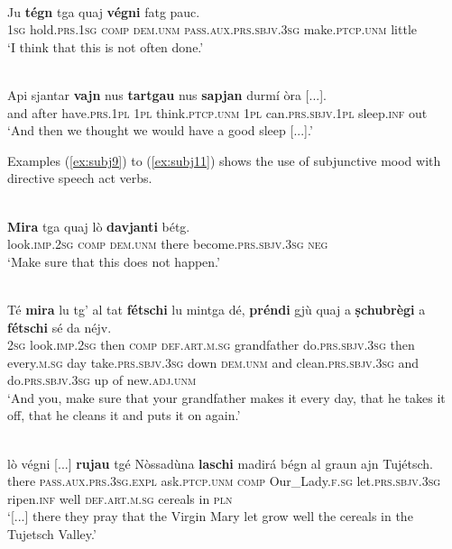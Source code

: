 \ea
\label{ex:subj6}
\\
\gll  Ju \textbf{tégn} tga quaj \textbf{végni} fatg pauc.  \\
\textsc{1sg} hold.\textsc{prs.1sg} \textsc{comp} \textsc{dem.unm} \textsc{pass.aux.prs.sbjv.3sg} make.\textsc{ptcp.unm} little\\
\glt `I think that this is not often done.'
\z

\ea
\label{ex:subj8}
\\
\gll    Api sjantar \textbf{vajn} nus \textbf{tartgau} {\longrule} nus \textbf{sapjan} durmí òra [...].\\
and after have.\textsc{prs.1pl} \textsc{1pl} think.\textsc{ptcp.unm} {} \textsc{1pl}  can.\textsc{prs.sbjv.1pl} sleep.\textsc{inf} out\\
\glt `And then we thought we would have a good sleep [...].'
\z

Examples (\ref{ex:subj9}) to (\ref{ex:subj11}) shows the use of subjunctive mood with directive speech act verbs.

\ea
\label{ex:subj9}
\\
\gll  \textbf{Mira} tga quaj lò \textbf{davjanti} bétg. \\
look.\textsc{imp.2sg} \textsc{comp} \textsc{dem.unm} there become.\textsc{prs.sbjv.3sg} \textsc{neg}\\
\glt `Make sure that this does not happen.'
\z

\ea
\label{ex:subj10}
\\
\gll  Té \textbf{mira} lu tg’ al tat \textbf{fétschi} lu mintga dé, \textbf{préndi} gjù quaj a \textbf{ṣchubrègi} a \textbf{fétschi} sé da néjv.\\
\textsc{2sg} look.\textsc{imp.2sg} then \textsc{comp} \textsc{def.art.m.sg} grandfather do.\textsc{prs.sbjv.3sg} then every.\textsc{m.sg} day take.\textsc{prs.sbjv.3sg} down \textsc{dem.unm} and clean.\textsc{prs.sbjv.3sg} and do.\textsc{prs.sbjv.3sg} up of new.\textsc{adj.unm} \\
\glt `And you, make sure that your grandfather makes it every day, that he takes it off, that he cleans it and puts it on again.'
\z

\ea
\label{ex:subj11}
 {\citealt[94]{Büchli1966}}\\
\gll [...] lò végni [...] \textbf{rujau} tgé Nòssadùna \textbf{laschi} madirá bégn al graun ajn Tujétsch.\\
{} there \textsc{pass.aux.prs.3sg.expl} {} ask.\textsc{ptcp.unm} \textsc{comp} Our\_Lady.\textsc{f.sg} let.\textsc{prs.sbjv.3sg} ripen.\textsc{inf} well \textsc{def.art.m.sg} cereals in \textsc{pln}\\
\glt `[...] there they pray that the Virgin Mary let grow well the cereals in the Tujetsch Valley.'
\z

